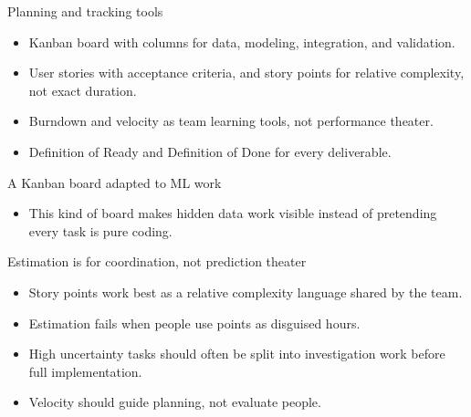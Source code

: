 \begin{frame}{Planning and tracking tools}
\begin{itemize}
\item Kanban board with columns for data, modeling, integration, and validation.
\item User stories with acceptance criteria, and story points for relative complexity, not exact duration.
\item Burndown and velocity as team learning tools, not performance theater.
\item Definition of Ready and Definition of Done for every deliverable.
\end{itemize}
\coursefooter
\end{frame}

\begin{frame}{A Kanban board adapted to ML work}
\centering
{}
\vspace{0.5em}
\begin{itemize}
\item This kind of board makes hidden data work visible instead of pretending every task is pure coding.
\end{itemize}
\coursefooter
\end{frame}

\begin{frame}{Estimation is for coordination, not prediction theater}
\begin{itemize}
\item Story points work best as a relative complexity language shared by the team.
\item Estimation fails when people use points as disguised hours.
\item High uncertainty tasks should often be split into investigation work before full implementation.
\item Velocity should guide planning, not evaluate people.
\end{itemize}
\coursefooter
\end{frame}

